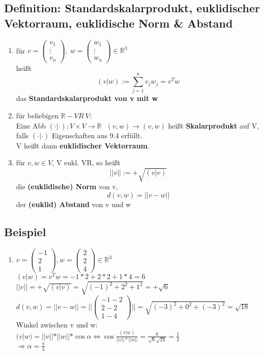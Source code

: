 \subsection{Definition: Standardskalarprodukt, euklidischer Vektorraum, euklidische Norm \& Abstand}
\begin{enumerate}
	\item
	für $v=\begin{pmatrix}v_1 \\ \vdots \\ v_n\end{pmatrix}, \ w=\begin{pmatrix}w_1 \\ \vdots \\ w_n\end{pmatrix}\in \mathbb{R}^3$\\
	heißt \[(v|w):=\sum_{j=1}^n v_jw_j = v^Tw\] das \textbf{Standardskalarprodukt von v mit w}
	
	\item
	für beliebigen $\mathbb{R}-VR \ V$:\\
	Eine Abb $(\cdot | \cdot ): V\times V\rightarrow\mathbb{R} \ \ \ (v,w)\rightarrow (v,w)$ heißt \textbf{Skalarprodukt} auf V, falls $(\cdot | \cdot )$ Eigenschaften aus 9.4 erfüllt.\\
	V heißt dann \textbf{euklidischer Vektorraum}.
	
	\item
	für $v,w\in V$, V eukl. VR, so heißt \[||v|| := +\sqrt{(v|v)}\] die \textbf{(euklidische) Norm} von v, \[d(v,w)=||v-w||\] der \textbf{(euklid) Abstand} von v und w
\end{enumerate}

\subsection{Beispiel}
\begin{enumerate}
	\item
	$v=\begin{pmatrix}-1 \\ 2 \\ 1\end{pmatrix}, w=\begin{pmatrix}2 \\ 2 \\ 4\end{pmatrix}\in\mathbb{R}^3$\\
	$(v|w)=v^Tw=-1*2+2*2+1*4=6$\\
	$||v||=+\sqrt{(v|v)}=\sqrt{(-1)^2+2^2+1^2}=+\sqrt{6}$\\
	$d(v,w)=||v-w||=||\begin{pmatrix}-1-2 \\ 2-2 \\ 1-4\end{pmatrix}||=\sqrt{(-3)^2+0^2+(-3)^2}=\sqrt{18}$\\
	Winkel zwischen v und w:\\
	$(v|w)=||v||*||w||*\cos \alpha \Leftrightarrow \cos \frac{(v|w)}{||v||*||w||}=\frac{6}{\sqrt{6}\sqrt{24}}=\frac{1}{2}$\\
	$\Rightarrow \alpha=\frac{\pi}{3}$
\end{enumerate}
